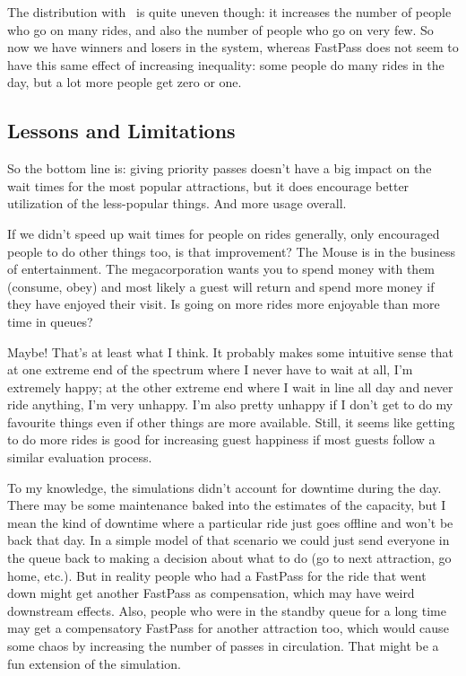 The distribution with \FPP~is quite uneven though: it increases the number of people who go on many rides, and also the number of people who go on very few. So now we have winners and losers in the system, whereas FastPass does not seem to have this same effect of increasing inequality: some people do many rides in the day, but a lot more people get zero or one. 

\subsection*{Lessons and Limitations}
So the bottom line is: giving priority passes doesn't have a big impact on the wait times for the most popular attractions, but it does encourage better utilization of the less-popular things. And more usage overall.

If we didn't speed up wait times for people on rides generally, only encouraged people to do other things too, is that improvement? The Mouse is in the business of entertainment. The megacorporation wants you to spend money with them (consume, obey) and most likely a guest will return and spend more money if they have enjoyed their visit. Is going on more rides more enjoyable than more time in queues? 

Maybe! That's at least what I think. It probably makes some intuitive sense that at one extreme end of the spectrum where I never have to wait at all, I'm extremely happy; at the other extreme end where I wait in line all day and never ride anything, I'm very unhappy. I'm also pretty unhappy if I don't get to do my favourite things even if other things are more available. Still, it seems like getting to do more rides is good for increasing guest happiness if most guests follow a similar evaluation process. 

To my knowledge, the simulations didn't account for downtime during the day. There may be some maintenance baked into the estimates of the capacity, but I mean the kind of downtime where a particular ride just goes offline and won't be back that day. In a simple model of that scenario we could just send everyone in the queue back to making a decision about what to do (go to next attraction, go home, etc.). But in reality people who had a FastPass for the ride that went down might get another FastPass as compensation, which may have weird downstream effects. Also, people who were in the standby queue for a long time may get a compensatory FastPass for another attraction too, which would cause some chaos by increasing the number of passes in circulation. That might be a fun extension of the simulation.

